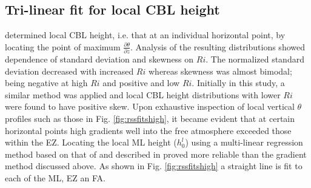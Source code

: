 \documentclass[referee]{svjour3}
\begin{document}
\subsection{Tri-linear fit for local CBL height}
\cite{SullMoengStev} determined local CBL height, i.e. that at an individual horizontal point, by locating the point of maximum $\frac{\partial \theta}{\partial z}$.  Analysis of the resulting distributions showed dependence of standard deviation and skewness on $Ri$.  The normalized standard deviation decreased with increased $Ri$ whereas skewness was almost bimodal; being negative at high $Ri$ and positive and low $Ri$.  Initially in this study, a similar method was applied and local CBL height distributions with lower $Ri$ were found to have positive skew.  Upon exhaustive inspection of local vertical $\theta$  profiles such as those in Fig. \ref{fig:rssfitshigh}, it became evident that at certain horizontal points high gradients well into the free atmosphere exceeded those within the EZ.  Locating the local ML height ($h^{l}_{0}$) using a multi-linear regression method based on that of \citep{Vieth} and described in \cite{NChap14} proved more reliable than the gradient method discussed above.  As shown in Fig. \ref{fig:rssfitshigh} a straight line is fit to each of the ML, EZ an FA.\\
  
\end{document}
